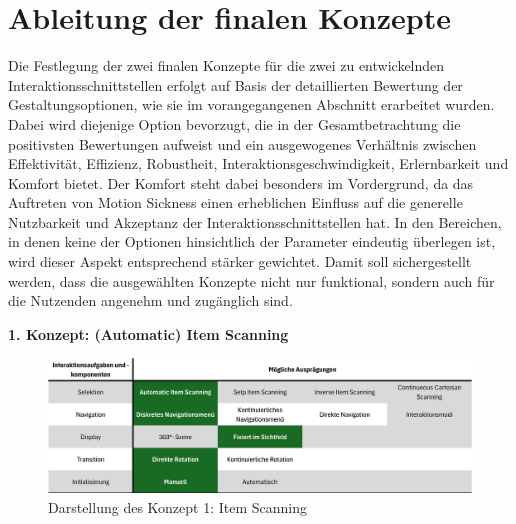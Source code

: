 \section{Ableitung der finalen Konzepte}

Die Festlegung der zwei finalen Konzepte für die zwei zu entwickelnden Interaktionsschnittstellen erfolgt auf Basis der detaillierten Bewertung der Gestaltungsoptionen, wie sie im vorangegangenen Abschnitt erarbeitet wurden. Dabei wird diejenige Option bevorzugt, die in der Gesamtbetrachtung die positivsten Bewertungen aufweist und ein ausgewogenes Verhältnis zwischen Effektivität, Effizienz, Robustheit, Interaktionsgeschwindigkeit, Erlernbarkeit und Komfort bietet.
Der Komfort steht dabei besonders im Vordergrund, da das Auftreten von Motion Sickness einen erheblichen Einfluss auf die generelle Nutzbarkeit und Akzeptanz der Interaktionsschnittstellen hat. In den Bereichen, in denen keine der Optionen hinsichtlich der Parameter eindeutig überlegen ist, wird dieser Aspekt entsprechend stärker gewichtet. Damit soll sichergestellt werden, dass die ausgewählten Konzepte nicht nur funktional, sondern auch für die Nutzenden angenehm und zugänglich sind.


{\normalfont \bfseries 1. Konzept: (Automatic) Item Scanning} 

\begin{figure}[tbh]
    \centering
    \includegraphics[width=1.0\textwidth]{images/MorphKasten-Item.png}
    \caption{Darstellung des Konzept 1: Item Scanning}
    \label{fig:MorphKasten-Item}
\end{figure}

